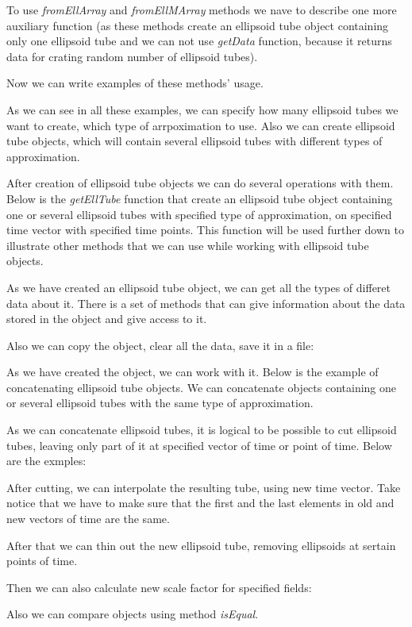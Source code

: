\documentclass[letterpaper,10pt,english]{sphinxmanual}
\begin{document}
To use \emph{fromEllArray} and \emph{fromEllMArray} methods we nave to describe one more auxiliary function (as these methods create an ellipsoid tube object containing only one ellipsoid tube and we can not use \emph{getData} function, because it returns data for crating random number of ellipsoid tubes).

Now we can write examples of these methods' usage.

As we can see in all these examples, we can specify how many ellipsoid tubes we want to create, which type of arrpoximation to use. Also we can create ellipsoid tube objects, which will contain several ellipsoid tubes with different types of approximation.

After creation of ellipsoid tube objects we can do several operations with them. Below is the \emph{getEllTube} function that create an ellipsoid tube object containing one or several ellipsoid tubes with specified type of approximation, on specified time vector with specified time points. This function will be used further down to illustrate other methods that we can use while working with ellipsoid tube objects.

As we have created an ellipsoid tube object, we can get all the types of differet data about it. There is a set of methods that can give information about the data stored in the object and give access to it.

Also we can copy the object, clear all the data, save it in a file:

As we have created the object, we can work with it. Below is the example of concatenating ellipsoid tube objects. We can concatenate objects containing one or several ellipsoid tubes with the same type of approximation.

As we can concatenate ellipsoid tubes, it is logical to be possible to cut ellipsoid tubes, leaving only part of it at specified vector of time or point of time. Below are the exmples:

After cutting, we can interpolate the resulting tube, using new time vector. Take notice that we have to make sure that the first and the last elements in old and new vectors of time are the same.

After that we can thin out the new ellipsoid tube, removing ellipsoids at sertain points of time.

Then we can also calculate new scale factor for specified fields:

Also we can compare objects using method \emph{isEqual}.
\end{document}
